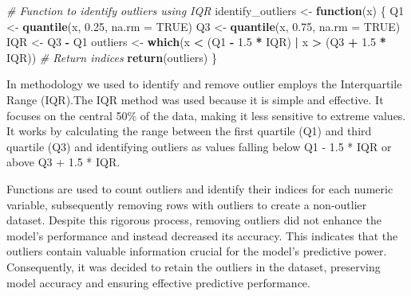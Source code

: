 \documentclass[
  10pt,
  paper=a4,
  ,captions=tableheading
]{scrartcl}
\newenvironment{Shaded}{\begin{snugshade}}{\end{snugshade}}
\newcommand{\AttributeTok}[1]{\textcolor[rgb]{0.13,0.29,0.53}{#1}}
\newcommand{\CommentTok}[1]{\textcolor[rgb]{0.56,0.35,0.01}{\textit{#1}}}
\newcommand{\ConstantTok}[1]{\textcolor[rgb]{0.56,0.35,0.01}{#1}}
\newcommand{\ControlFlowTok}[1]{\textcolor[rgb]{0.13,0.29,0.53}{\textbf{#1}}}
\newcommand{\FloatTok}[1]{\textcolor[rgb]{0.00,0.00,0.81}{#1}}
\newcommand{\FunctionTok}[1]{\textcolor[rgb]{0.13,0.29,0.53}{\textbf{#1}}}
\newcommand{\NormalTok}[1]{#1}
\newcommand{\OtherTok}[1]{\textcolor[rgb]{0.56,0.35,0.01}{#1}}
\newcommand{\SpecialCharTok}[1]{\textcolor[rgb]{0.81,0.36,0.00}{\textbf{#1}}}
\begin{document}
\begin{Shaded}
\begin{Highlighting}[]
\CommentTok{\# Function to identify outliers using IQR}
\NormalTok{identify\_outliers }\OtherTok{\textless{}{-}} \ControlFlowTok{function}\NormalTok{(x) \{}
\NormalTok{    Q1 }\OtherTok{\textless{}{-}} \FunctionTok{quantile}\NormalTok{(x, }\FloatTok{0.25}\NormalTok{, }\AttributeTok{na.rm =} \ConstantTok{TRUE}\NormalTok{)}
\NormalTok{    Q3 }\OtherTok{\textless{}{-}} \FunctionTok{quantile}\NormalTok{(x, }\FloatTok{0.75}\NormalTok{, }\AttributeTok{na.rm =} \ConstantTok{TRUE}\NormalTok{)}
\NormalTok{    IQR }\OtherTok{\textless{}{-}}\NormalTok{ Q3 }\SpecialCharTok{{-}}\NormalTok{ Q1}
\NormalTok{    outliers }\OtherTok{\textless{}{-}} \FunctionTok{which}\NormalTok{(x }\SpecialCharTok{\textless{}}\NormalTok{ (Q1 }\SpecialCharTok{{-}} \FloatTok{1.5} \SpecialCharTok{*}\NormalTok{ IQR) }\SpecialCharTok{|}\NormalTok{ x }\SpecialCharTok{\textgreater{}}\NormalTok{ (Q3 }\SpecialCharTok{+} \FloatTok{1.5} \SpecialCharTok{*}\NormalTok{ IQR))  }\CommentTok{\# Return indices}
    \FunctionTok{return}\NormalTok{(outliers)}
\NormalTok{\}}
\end{Highlighting}
\end{Shaded}

\small

In methodology we used to identify and remove outlier employs the
Interquartile Range (IQR).The IQR method was used because it is simple
and effective. It focuses on the central 50\% of the data, making it
less sensitive to extreme values. It works by calculating the range
between the first quartile (Q1) and third quartile (Q3) and identifying
outliers as values falling below Q1 - 1.5 * IQR or above Q3 + 1.5 * IQR.

Functions are used to count outliers and identify their indices for each
numeric variable, subsequently removing rows with outliers to create a
non-outlier dataset. Despite this rigorous process, removing outliers
did not enhance the model's performance and instead decreased its
accuracy. This indicates that the outliers contain valuable information
crucial for the model's predictive power. Consequently, it was decided
to retain the outliers in the dataset, preserving model accuracy and
ensuring effective predictive performance.

\small
\end{document}
